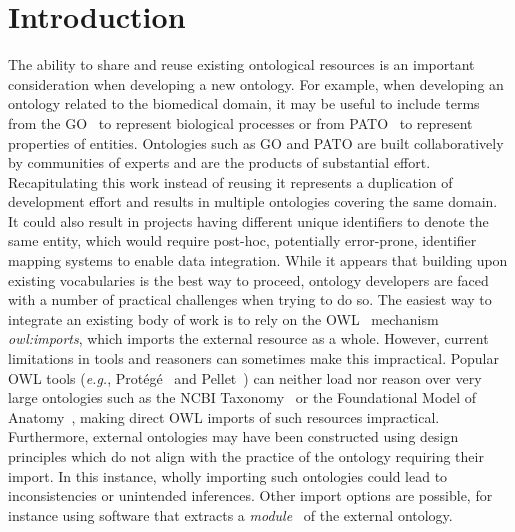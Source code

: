 \documentclass[jou]{ao2e}%
\begin{document}
\section{Introduction}

The ability to share and reuse existing ontological resources is an important consideration when developing a new ontology.
For example, when developing an ontology related to the biomedical domain, it may be useful to include terms from the \ac{GO}~\citep{GO} to represent biological processes or from \ac{PATO}~\citep{PATO} to represent properties of entities.
Ontologies such as GO and PATO are built collaboratively by communities of experts and are the products of substantial effort.
Recapitulating this work instead of reusing it represents a duplication of development effort and results in multiple ontologies covering the same domain. It could also result in projects having different unique identifiers to denote the same entity, which would require post-hoc, potentially error-prone, identifier mapping systems to enable data integration. 
While it appears that building upon existing vocabularies is the best way to proceed, ontology developers are faced with a number of practical challenges when trying to do so.
The easiest way to integrate an existing body of work is to rely on the \ac{OWL}~\citep{OWL} mechanism \emph{owl:imports}, which imports the external resource as a whole.
However, current limitations in tools and reasoners can sometimes make this impractical.
Popular OWL tools (\emph{e.g.}, Prot\'eg\'e~\citep{Protege} and Pellet~\citep{Sirin}) can neither load nor reason over very large ontologies such as the NCBI Taxonomy~\citep{NCBI} or the Foundational Model of Anatomy~\citep{FMA}, making direct \ac{OWL} imports of such resources impractical. 
Furthermore, external ontologies may have been constructed using design principles which do not align with the practice of the ontology requiring their import.  In this instance, wholly importing such ontologies could lead to inconsistencies or unintended inferences. %
Other import options are possible, for instance using software that extracts a \emph{module}~\citep{Grau} of the external ontology.
\end{document}

